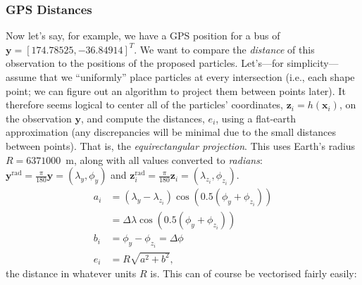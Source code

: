 \documentclass[11pt]{article}\usepackage[]{graphicx}\usepackage[]{color}
\newcommand{\bx}{\boldsymbol{x}}
\newcommand{\bz}{\boldsymbol{z}}
\newcommand{\by}{\boldsymbol{y}}
\begin{document}
\subsubsection{GPS Distances}

Now let's say, for example, we have a GPS position for a bus of $\by = [174.78525, -36.84914]^T$.
We want to compare the \emph{distance} of this observation to the positions of the proposed particles.
Let's---for simplicity---assume that we ``uniformly'' place particles at every intersection (i.e.,
each shape point; we can figure out an algorithm to project them between points later).
It therefore seems logical to center all of the particles' coordinates, 
$\bz_i = h(\bx_i)$, on the observation $\by$, and compute
the distances, $e_i$, using a flat-earth approximation (any discrepancies will be minimal due to the small
distances between points). That is, the \emph{equirectangular projection}.
This uses Earth's radius $R = 6371000$~m, along with all values converted to \emph{radians}:
$\by^{\mathrm{rad}} = \frac{\pi}{180}\by = \left(\lambda_y, \phi_y\right)$ and
$\bz_i^{\mathrm{rad}} = \frac{\pi}{180}\bz_i = \left(\lambda_{z_i}, \phi_{z_i}\right)$.
\begin{align*}
  a_i &= \left( \lambda_y - \lambda_{z_{i}} \right) \cos\left(0.5\left(\phi_y + \phi_{z_i}\right)\right) \\
  &= \Delta\lambda \cos\left(0.5\left(\phi_y + \phi_{z_i}\right)\right) \\
  b_i &= \phi_y - \phi_{z_i} = \Delta\phi \\
  e_i &= R \sqrt{a^2 + b^2},
\end{align*}
the distance in whatever units $R$ is.
This can of course be vectorised fairly easily:
\end{document}
